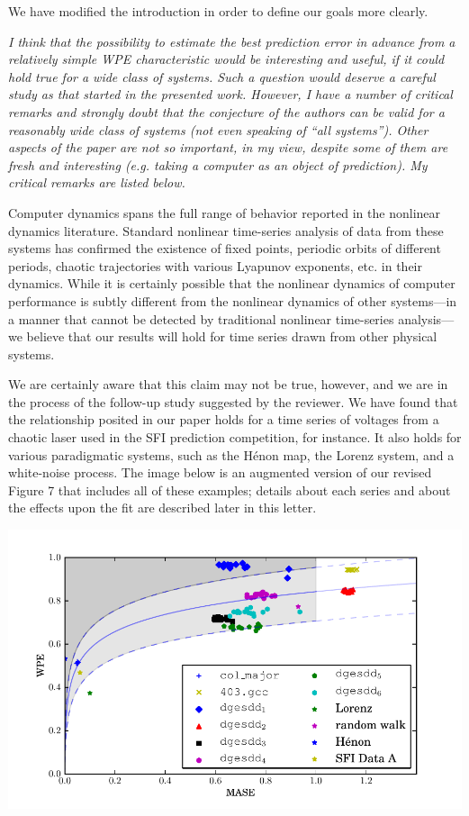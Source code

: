\documentclass[12pt]{article}
\begin{document}
We have modified the introduction in order to define our goals more
clearly.

\smallskip

\emph{I think that the possibility to estimate the best prediction
  error in advance from a relatively simple WPE characteristic would
  be interesting and useful, if it could hold true for a wide class of
  systems. Such a question would deserve a careful study as that
  started in the presented work. However, I have a number of critical
  remarks and strongly doubt that the conjecture of the authors can be
  valid for a reasonably wide class of systems (not even speaking of
  ``all systems''). Other aspects of the paper are not so important,
  in my view, despite some of them are fresh and interesting
  (e.g. taking a computer as an object of prediction). My critical
  remarks are listed below.}

Computer dynamics spans the full range of behavior reported in the
nonlinear dynamics literature.  Standard nonlinear time-series
analysis of data from these systems has confirmed the existence of
fixed points, periodic orbits of different periods, chaotic
trajectories with various Lyapunov exponents, etc.  in their dynamics.
While it is certainly possible that the nonlinear dynamics of computer
performance is subtly different from the nonlinear dynamics of other
systems---in a manner that cannot be detected by traditional nonlinear
time-series analysis---we believe that our results will hold for time
series drawn from other physical systems.

We are certainly aware that this claim may not be true, however, and
we are in the process of the follow-up study suggested by the
reviewer.  We have found that the relationship posited in our paper
holds for a time series of voltages from a chaotic laser used in the
SFI prediction competition, for instance.  It also holds for various
paradigmatic systems, such as the H\'{e}non map, the Lorenz system,
and a white-noise process.  The image below is an augmented version of
our revised Figure 7 that includes all of these examples; details
about each series and about the effects upon the fit are described
later in this letter.

\begin{center}
    \includegraphics[width=0.8\columnwidth]{figs/new_prediction_vs_entropy_extras}
\end{center}
\end{document}

